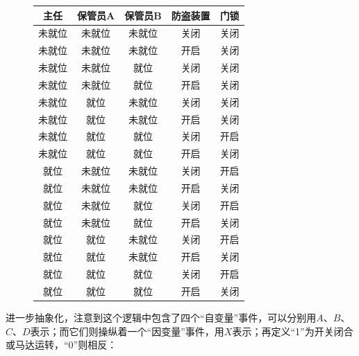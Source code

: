 \documentclass[UTF8]{ctexart}
\begin{document}
\begin{figure}
    \begin{tabular}{|c|c|c|c|c|}\hline\rowcolor{lightgray}
        主任   &保管员A&保管员B & 防盗装置&门锁\\\hline
        未就位 &未就位 & 未就位 & 关闭   &关闭\\\hline
        未就位 &未就位 & 未就位 & 开启   &关闭\\\hline
        未就位 &未就位 &   就位 & 关闭   &关闭\\\hline
        未就位 &未就位 &   就位 & 开启   &关闭\\\hline
        未就位 &  就位 & 未就位 & 关闭   &关闭\\\hline
        未就位 &  就位 & 未就位 & 开启   &关闭\\\hline
        未就位 &  就位 &   就位 & 关闭   &开启\\\hline
        未就位 &  就位 &   就位 & 开启   &关闭\\\hline
        就位   &未就位 & 未就位 & 关闭   &开启\\\hline
        就位   &未就位 & 未就位 & 开启   &关闭\\\hline
        就位   &未就位 &   就位 & 关闭   &开启\\\hline
        就位   &未就位 &   就位 & 开启   &关闭\\\hline
        就位   &  就位 & 未就位 & 关闭   &开启\\\hline
        就位   &  就位 & 未就位 & 开启   &关闭\\\hline
        就位   &  就位 &   就位 & 关闭   &开启\\\hline
        就位   &  就位 &   就位 & 开启   &关闭\\\hline
    \end{tabular}
\end{figure}

进一步抽象化，注意到这个逻辑中包含了四个“自变量”事件，可以分别用$A$、$B$、$C$、$D$表示；而它们则操纵着一个“因变量”事件，用$X$表示；再定义“1”为开关闭合或马达运转，“0”则相反：
\end{document}
